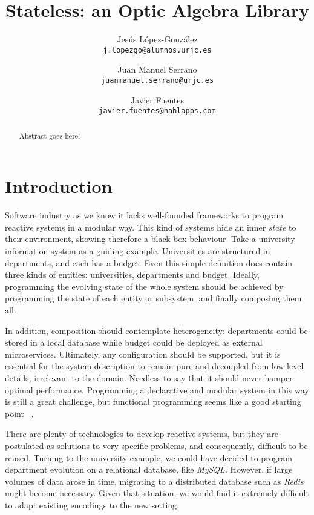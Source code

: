 \documentclass[a4paper]{article}
\begin{document}
\title{Stateless: an Optic Algebra Library}
\author{
  Jesús López-González\\
  \texttt{j.lopezgo@alumnos.urjc.es}
  \and
  Juan Manuel Serrano\\
  \texttt{juanmanuel.serrano@urjc.es}
  \and
  Javier Fuentes\\
  \texttt{javier.fuentes@hablapps.com}
}

\maketitle

\begin{abstract}

  Abstract goes here!

\end{abstract}

\section{Introduction}


Software industry as we know it lacks
well-founded frameworks to program reactive systems in a modular way. This kind
of systems hide an inner \emph{state} to their environment, showing therefore a
black-box behaviour. Take a university information system as a guiding example.
Universities are structured in departments, and each has a budget. Even this
simple definition does contain three kinds of entities: universities,
departments and budget. Ideally, programming the evolving state of the whole
system should be achieved by programming the state of each entity or subsystem,
and finally composing them all.

In addition, composition should contemplate heterogeneity: departments could be
stored in a local database while budget could be deployed as external
microservices. Ultimately, any configuration should be supported, but it is
essential for the system description to remain pure and decoupled from low-level
details, irrelevant to the domain. Needless to say that it should never hamper
optimal performance. Programming a declarative and modular system in this way is
still a great challenge, but functional programming seems like a good starting
point ~\cite{hughes1989functional}.


There are plenty of technologies to develop reactive systems, but they are
postulated as solutions to very specific problems, and consequently, difficult
to be reused. Turning to the university example, we could have decided to
program department evolution on a relational database, like \emph{MySQL}.
However, if large volumes of data arose in time, migrating to a distributed
database such as \emph{Redis} might become necessary. Given that situation, we
would find it extremely difficult to adapt existing encodings to the new
setting.
\end{document}
